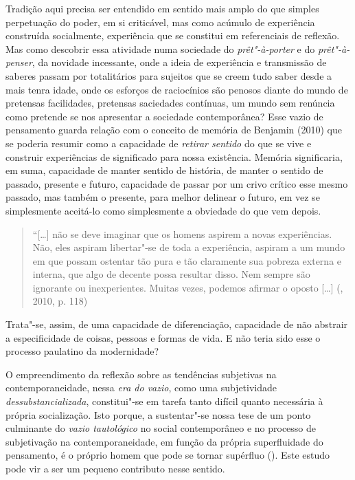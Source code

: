 Tradição aqui precisa ser entendido em sentido mais amplo do que simples
perpetuação do poder, em si criticável, mas como acúmulo de experiência
construída socialmente, experiência que se constitui em referenciais de
reflexão. Mas como descobrir essa atividade numa sociedade do
\emph{prêt"-à-porter} e do \emph{prêt"-à-penser}, da novidade incessante,
onde a ideia de experiência e transmissão de saberes passam por
totalitários para sujeitos que se creem tudo saber desde a mais tenra
idade, onde os esforços de raciocínios são penosos diante do mundo de
pretensas facilidades, pretensas saciedades contínuas, um mundo sem
renúncia como pretende se nos apresentar a sociedade contemporânea? Esse
vazio de pensamento guarda relação com o conceito de memória de Benjamin
(2010) que se poderia resumir como a capacidade de \emph{retirar
sentido} do que se vive e construir experiências de significado para
nossa existência. Memória significaria, em suma, capacidade de manter
sentido de história, de manter o sentido de passado, presente e futuro,
capacidade de passar por um crivo crítico esse mesmo passado, mas também
o presente, para melhor delinear o futuro, em vez se simplesmente
aceitá-lo como simplesmente a obviedade do que vem depois.

\begin{quote}
``[\ldots{}] não se deve imaginar que os homens aspirem a novas
experiências. Não, eles aspiram libertar"-se de toda a experiência,
aspiram a um mundo em que possam ostentar tão pura e tão claramente sua
pobreza externa e interna, que algo de decente possa resultar disso. Nem
sempre são ignorante ou inexperientes. Muitas vezes, podemos afirmar o
oposto [\ldots{}] (, 2010, p. 118)
\end{quote}

Trata"-se, assim, de uma capacidade de diferenciação, capacidade de não
abstrair a especificidade de coisas, pessoas e formas de vida. E não
teria sido esse o processo paulatino da modernidade?

O empreendimento da reflexão sobre as tendências subjetivas na
contemporaneidade, nessa \emph{era do vazio}, como uma subjetividade
\emph{dessubstancializada}, constitui"-se em tarefa tanto difícil quanto
necessária à própria socialização. Isto porque, a sustentar"-se nossa
tese de um ponto culminante do \emph{vazio tautológico} no social
contemporâneo e no processo de subjetivação na contemporaneidade, em
função da própria superfluidade do pensamento, é o próprio homem que
pode se tornar supérfluo (). Este estudo pode vir a ser um pequeno
contributo nesse sentido.

